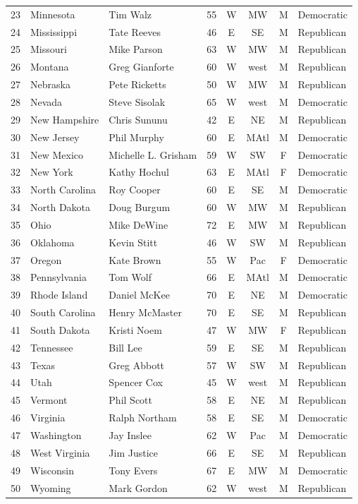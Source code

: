 \documentclass[11pt]{article}
\begin{document}
\begin{table}[ht]
\begin{tabular}{rll c cccl}
  23 & Minnesota & Tim Walz & 55 & W & MW & M & Democratic \\ 
  24 & Mississippi & Tate Reeves & 46 & E & SE & M & Republican \\ 
  25 & Missouri & Mike Parson & 63 & W & MW & M & Republican \\ 
  26 & Montana & Greg Gianforte & 60 & W & west & M & Republican \\ 
  27 & Nebraska & Pete Ricketts & 50 & W & MW & M & Republican \\ 
  28 & Nevada & Steve Sisolak & 65 & W & west & M & Democratic \\ 
  29 & New Hampshire & Chris Sununu & 42 & E & NE & M & Republican \\ 
  30 & New Jersey & Phil Murphy & 60 & E & MAtl & M & Democratic \\ 
  31 & New Mexico & Michelle L. Grisham & 59 & W & SW & F & Democratic \\ 
  32 & New York & Kathy Hochul & 63 & E & MAtl & F & Democratic \\ 
  33 & North Carolina & Roy Cooper & 60 & E & SE & M & Democratic \\ 
  34 & North Dakota & Doug Burgum & 60 & W & MW & M & Republican \\ 
  35 & Ohio & Mike DeWine & 72 & E & MW & M & Republican \\ 
  36 & Oklahoma & Kevin Stitt & 46 & W & SW & M & Republican \\ 
  37 & Oregon & Kate Brown & 55 & W & Pac & F & Democratic \\ 
  38 & Pennsylvania & Tom Wolf & 66 & E & MAtl & M & Democratic \\ 
  39 & Rhode Island & Daniel McKee & 70 & E & NE & M & Democratic \\ 
  40 & South Carolina & Henry McMaster & 70 & E & SE & M & Republican \\ 
  41 & South Dakota & Kristi Noem & 47 & W & MW & F & Republican \\ 
  42 & Tennessee & Bill Lee & 59 & E & SE & M & Republican \\ 
  43 & Texas & Greg Abbott & 57 & W & SW & M & Republican \\ 
  44 & Utah & Spencer Cox & 45 & W & west & M & Republican \\ 
  45 & Vermont & Phil Scott & 58 & E & NE & M & Republican \\ 
  46 & Virginia & Ralph Northam & 58 & E & SE & M & Democratic \\ 
  47 & Washington & Jay Inslee & 62 & W & Pac & M & Democratic \\ 
  48 & West Virginia & Jim Justice & 66 & E & SE & M & Republican \\ 
  49 & Wisconsin & Tony Evers & 67 & E & MW & M & Democratic \\ 
  50 & Wyoming & Mark Gordon & 62 & W & west & M & Republican \\ 
   \hline
\end{tabular}
\end{table}
\end{document}
